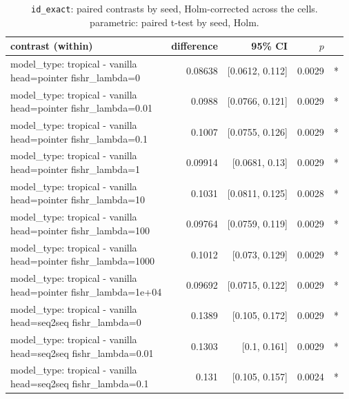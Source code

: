 \documentclass[10pt]{article}
\makeatletter
\newcommand{\stackcell}[1]{\begin{tabular}[t]{@{}l@{}}#1\end{tabular}}
\makeatother
\begin{document}
{\small
\begin{longtable}{lrrrl}
\caption{\texttt{id\_exact}: paired contrasts by seed, Holm-corrected across the cells. parametric: paired t-test by seed, Holm.}\label{tab:paired-id_exact}\\
\toprule
contrast (within) & difference & 95\% CI & $p$ & \\
\midrule
\endhead
\stackcell{model\_type: tropical - vanilla\\\footnotesize head=pointer fishr\_lambda=0 } & 0.08638 & [0.0612, 0.112] & 0.0029 & *\\
\stackcell{model\_type: tropical - vanilla\\\footnotesize head=pointer fishr\_lambda=0.01 } & 0.0988 & [0.0766, 0.121] & 0.0029 & *\\
\stackcell{model\_type: tropical - vanilla\\\footnotesize head=pointer fishr\_lambda=0.1 } & 0.1007 & [0.0755, 0.126] & 0.0029 & *\\
\stackcell{model\_type: tropical - vanilla\\\footnotesize head=pointer fishr\_lambda=1 } & 0.09914 & [0.0681, 0.13] & 0.0029 & *\\
\stackcell{model\_type: tropical - vanilla\\\footnotesize head=pointer fishr\_lambda=10 } & 0.1031 & [0.0811, 0.125] & 0.0028 & *\\
\stackcell{model\_type: tropical - vanilla\\\footnotesize head=pointer fishr\_lambda=100 } & 0.09764 & [0.0759, 0.119] & 0.0029 & *\\
\stackcell{model\_type: tropical - vanilla\\\footnotesize head=pointer fishr\_lambda=1000 } & 0.1012 & [0.073, 0.129] & 0.0029 & *\\
\stackcell{model\_type: tropical - vanilla\\\footnotesize head=pointer fishr\_lambda=1e+04 } & 0.09692 & [0.0715, 0.122] & 0.0029 & *\\
\stackcell{model\_type: tropical - vanilla\\\footnotesize head=seq2seq fishr\_lambda=0 } & 0.1389 & [0.105, 0.172] & 0.0029 & *\\
\stackcell{model\_type: tropical - vanilla\\\footnotesize head=seq2seq fishr\_lambda=0.01 } & 0.1303 & [0.1, 0.161] & 0.0029 & *\\
\stackcell{model\_type: tropical - vanilla\\\footnotesize head=seq2seq fishr\_lambda=0.1 } & 0.131 & [0.105, 0.157] & 0.0024 & *\\

\end{longtable}}
\end{document}
